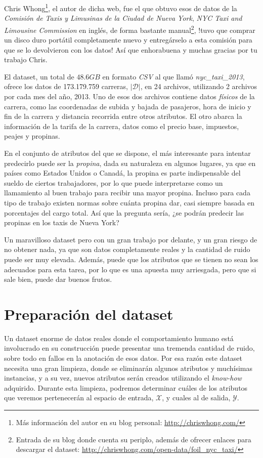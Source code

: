 Chris Whong\footnote{Más información del autor en su blog personal: \url{http://chriswhong.com/}}, el autor de dicha web, fue el que obtuvo esos de datos de la \emph{Comisión de Taxis y Limusinas de la Ciudad de Nueva York}, \emph{NYC Taxi and Limousine Commission} en inglés, de forma bastante manual\footnote{Entrada de su blog donde cuenta su periplo, además de ofrecer enlaces para descargar el dataset: \url{http://chriswhong.com/open-data/foil_nyc_taxi/}}, !tuvo que comprar un disco duro portátil completamente nuevo y entregárselo a esta comisión para que se lo devolvieron con los datos! Así que enhorabuena y muchas gracias por tu trabajo Chris.

El dataset, un total de $48.6GB$ en formato \emph{CSV} al que llamó \emph{nyc\_taxi\_2013}, ofrece los datos de 173.179.759 carreras, $|\mathcal{D}|$, en 24 archivos, utilizando 2 archivos por cada mes del año, 2013. Uno de esos dos archivos contiene datos \emph{físicos} de la carrera, como las coordenadas de subida y bajada de pasajeros, hora de inicio y fin de la carrera y distancia recorrida entre otros atributos. El otro abarca la información de la tarifa de la carrera, datos como el precio base, impuestos, peajes y propinas.

En el conjunto de atributos del que se dispone, el más interesante para intentar predecirlo puede ser la \emph{propina}, dada su naturaleza en algunos lugares, ya que en países como Estados Unidos o Canadá, la propina es parte indispensable del sueldo de ciertos trabajadores, por lo que puede interpretarse como un llamamiento al buen trabajo para recibir una mayor propina. Incluso para cada tipo de trabajo existen normas sobre cuánta propina dar, casi siempre basada en porcentajes del cargo total. Así que la pregunta sería, ¿se podrán predecir las propinas en los taxis de Nueva York?

Un maravilloso dataset pero con un gran trabajo por delante, y un gran riesgo de no obtener nada, ya que son datos completamente reales y la cantidad de ruido puede ser muy elevada. Además, puede que los atributos que se tienen no sean los adecuados para esta tarea, por lo que es una apuesta muy arriesgada, pero que si sale bien, puede dar buenos frutos. 

\section{Preparación del dataset} \label{sec:5.2}

Un dataset enorme de datos reales donde el comportamiento humano está involucrado en su construcción puede presentar una tremenda cantidad de ruido, sobre todo en fallos en la anotación de esos datos. Por esa razón este dataset necesita una gran limpieza, donde se eliminarán algunos atributos y muchísimas instancias, y a su vez, nuevos atributos serán creados utilizando el \emph{know-how} adquirido. Durante esta limpieza, podremos determinar cuáles de los atributos que veremos pertenecerán al espacio de entrada, $\mathcal{X}$, y cuales al de salida, $\mathcal{Y}$.

